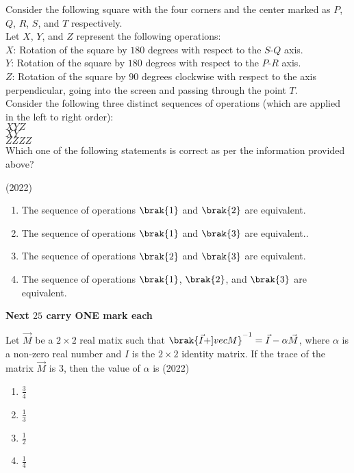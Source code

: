 	\item Consider the following square with the four corners and the center marked as $P$, $Q$, $R$, $S$, and $T$ respectively.\\
    Let $X$, $Y$, and $Z$ represent the following operations:\\
    $X$: Rotation of the square by $180$ degrees with respect to the $S$-$Q$ axis.\\
    $Y$: Rotation of the square by $180$ degrees with respect to the $P$-$R$ axis.\\
    $Z$: Rotation of the square by $90$ degrees clockwise with respect to the axis perpendicular, going into the screen and passing through the point $T$.\\
    Consider the following three distinct sequences of operations (which are applied in the left to right order):\\
     $XYZ$\\
     $XY$\\
     $ZZZZ$\\
      Which one of the following statements is correct as per the information provided above?
 
\hfill{(2022)}
    \begin{enumerate}
          \item The sequence of operations $\brak{1}$ and $\brak{2}$ are equivalent.
          \item The sequence of operations $\brak{1}$ and $\brak{3}$ are equivalent..
          \item The sequence of operations $\brak{2}$ and $\brak{3}$ are equivalent.
          \item The sequence of operations $\brak{1}$, $\brak{2}$, and $\brak{3} $ are equivalent.
    \end{enumerate}
    \textbf{Next $25$ carry ONE mark each}
    \item Let $\vec{M} $ be a $2\times 2$ real matix such that $\brak{\vec{I}+]vec{M}}^{-1}=\vec{I}-\alpha \vec{M}$, where $\alpha $ is a non-zero real number and $I$ is the $2\times 2$ identity matrix. If the trace of the matrix $\vec{M}$ is $3$, then the value of $\alpha$ is 
    \hfill{(2022)}
         \begin{enumerate}
               \item $\frac{3}{4}$
               \item $\frac{1}{3}$
               \item $\frac{1}{2}$
               \item $\frac{1}{4}$
         \end{enumerate}
